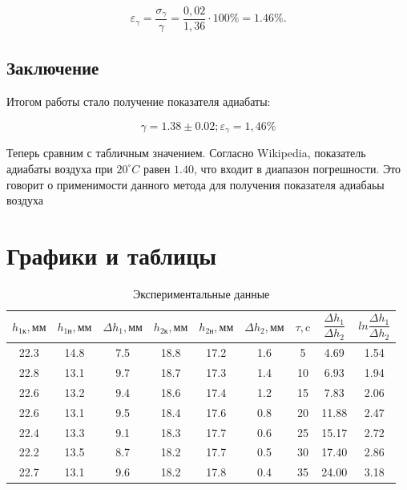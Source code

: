 \documentclass[a4paper,11.5pt]{article} %
\begin{document}
\begin{equation}
	\varepsilon_{\gamma} = \dfrac{\sigma_{\gamma}}{\gamma} = \dfrac{0,02}{1,36}\cdot 100 \% = 1.46\%.
\end{equation} 
 




\subsection{Заключение}

Итогом работы стало получение показателя адиабаты:

\begin{equation}
	\gamma = 1.38 \pm 0.02;   \varepsilon_{\gamma} = 1,46\% 
\end{equation} 

Теперь сравним с табличным значением. Согласно Wikipedia, показатель адиабаты воздуха при $20^{\circ} C$ равен $1.40$, что входит в диапазон погрешности. Это говорит о применимости данного метода для получения показателя адиабаьы воздуха


\section{Графики и таблицы}

\begin{center}
\begin{table}[h]
		\caption{Экспериментальные данные}
\begin{tabular}{|c|c|c|c|c|c|c|c|c|} \hline
$h_{1\text{к}}, \text{мм}$ & $h_{1\text{н}}, \text{мм}$ & $\Delta h_1, \text{мм}$ & $h_{2\text{к}}, \text{мм}$ & $h_{2\text{н}}, \text{мм}$ & $\Delta h_2, \text{мм}$ & $\tau, \text{c}$ & $\dfrac{\Delta h_1}{\Delta h_2}$ & $ln\dfrac{\Delta h_1}{\Delta h_2}$ \\ \hline
22.3 & 14.8 & 7.5 & 18.8 & 17.2 & 1.6 &  5 &  4.69 & 1.54  \\ \hline
22.8 & 13.1 & 9.7 & 18.7 & 17.3 & 1.4 & 10 &  6.93 & 1.94  \\ \hline
22.6 & 13.2 & 9.4 & 18.6 & 17.4 & 1.2 & 15 &  7.83 & 2.06  \\ \hline
22.6 & 13.1 & 9.5 & 18.4 & 17.6 & 0.8 & 20 & 11.88 & 2.47  \\ \hline
22.4 & 13.3 & 9.1 & 18.3 & 17.7 & 0.6 & 25 & 15.17 & 2.72  \\ \hline
22.2 & 13.5 & 8.7 & 18.2 & 17.7 & 0.5 & 30 & 17.40 & 2.86  \\ \hline
22.7 & 13.1 & 9.6 & 18.2 & 17.8 & 0.4 & 35 & 24.00 & 3.18  \\ \hline
\end{tabular}\\\\

\end{table}
\end{center}
\end{document}
